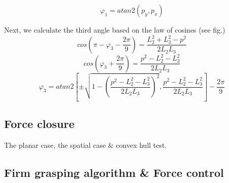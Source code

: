 \begin{equation}
φ_1 = atan2 \left( p_y, p_x \right)
\end{equation}

Next, we calculate the third angle based on the law of cosines (see fig.)
\[
cos \left( π - φ_3 - \frac{2π}{9} \right) = \frac{L_2^2 + L_3^2 - p^2}{2 L_2 L_3}
\]
\[
cos \left(φ_3 + \frac{2π}{9} \right) = \frac{p^2 - L_2^2 - L_3^2}{2 L_2 L_3}
\]
\begin{equation}
φ_3 = atan2 \left[ \pm \sqrt{1 - \left( \frac{p^2 - L_2^2 - L_3^2}{2 L_2 L_3} \right)^2} , \frac{p^2 - L_2^2 - L_3^2}{2 L_2 L_3} \right] - \frac{2π}{9}
\end{equation}


\subsection{Force closure}
The planar case, the spatial case \& convex hull test.

\subsection{Firm grasping algorithm \& Force control}